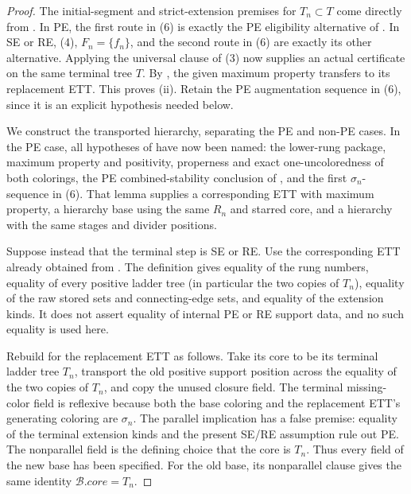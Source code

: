 \begin{proof}
The initial-segment and strict-extension premises for $T_n\subset T$
come directly from .  In PE, the first
route in (6) is exactly the PE eligibility alternative of
.  In SE or RE, (4), $F_n=\{f_n\}$, and the second
route in (6) are exactly its other alternative.  Applying the universal
clause of (3) now supplies an actual
 certificate on the same
terminal tree $T$.  By , the given
maximum property transfers to its replacement ETT.  This proves (ii).
Retain the PE augmentation sequence in (6), since it is an explicit
hypothesis needed below.

We construct the transported hierarchy, separating the PE and non-PE
cases.  In the PE case, all hypotheses of
 have now been named: the lower-rung package,
maximum property and positivity, properness and exact one-uncoloredness
of both colorings, the PE combined-stability conclusion of
, and the first $\sigma_n$-sequence
in (6).  That lemma supplies a corresponding ETT with maximum property,
a hierarchy base using the same $R_n$ and starred core, and a hierarchy
with the same stages and divider positions.

Suppose instead that the terminal step is SE or RE.  Use the corresponding
ETT already obtained from .  The definition
 gives equality of the rung
numbers, equality of every positive ladder tree (in particular the two
copies of $T_n$), equality of the raw stored sets and connecting-edge
sets, and equality of the extension kinds.  It does not assert equality
of internal PE or RE support data, and no such equality is used here.

Rebuild  for the replacement ETT as follows.
Take its core to be its terminal ladder tree $T_n$, transport the old
positive support position across the equality of the two copies of
$T_n$, and copy the unused closure field.  The terminal missing-color
field is reflexive because both the base coloring and the replacement
ETT's generating coloring are $\sigma_n$.  The parallel implication has
a false premise: equality of the terminal extension kinds and the present
SE/RE assumption rule out PE.  The nonparallel field is the defining
choice that the core is $T_n$.  Thus every field of the new base has been
specified.  For the old base, its nonparallel clause gives the same
identity $\mathcal B.\mathit{core}=T_n$.


\end{proof}
